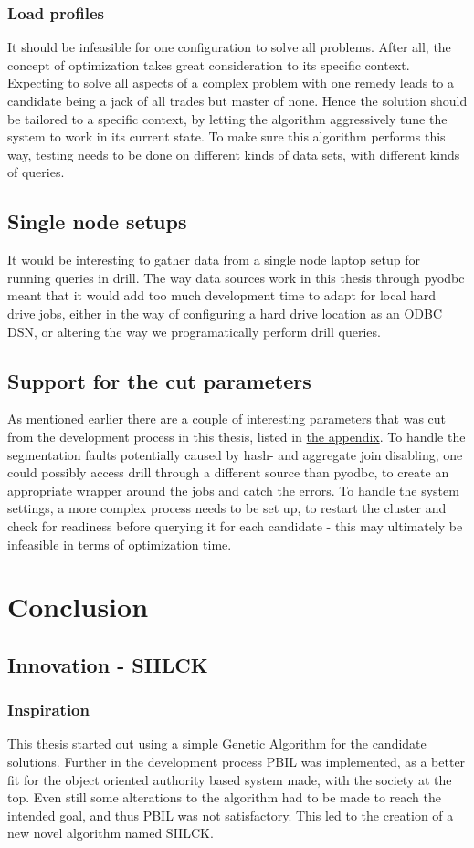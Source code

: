 \documentclass[a4paper,english]{report}
\begin{document}
	\subsection{Load profiles}
	It should be infeasible for one configuration to solve all problems. After all, the concept of optimization takes great consideration to its specific context. Expecting to solve all aspects of a complex problem with one remedy leads to a candidate being a jack of all trades but master of none. Hence the solution should be tailored to a specific context, by letting the algorithm aggressively tune the system to work in its current state. To make sure this algorithm performs this way, testing needs to be done on different kinds of data sets, with different kinds of queries.
	\section{Single node setups}
	It would be interesting to gather data from a single node laptop setup for running queries in drill. The way data sources work in this thesis through pyodbc meant that it would add too much development time to adapt for local hard drive jobs, either in the way of configuring a hard drive location as an ODBC DSN, or altering the way we programatically perform drill queries. 
	\section{Support for the cut parameters}
	As mentioned earlier there are a couple of interesting parameters that was cut from the development process in this thesis, listed in \hyperref[table:removed_params]{the appendix}. To handle the segmentation faults potentially caused by hash- and aggregate join disabling, one could possibly access drill through a different source than pyodbc, to create an appropriate wrapper around the jobs and catch the errors. To handle the system settings, a more complex process needs to be set up, to restart the cluster and check for readiness before querying it for each candidate - this may ultimately be infeasible in terms of optimization time.
	
	\chapter{Conclusion}
	\section{Innovation - SIILCK}
		\subsection{Inspiration}
		This thesis started out using a simple Genetic Algorithm for the candidate solutions. Further in the development process PBIL was implemented, as a better fit for the object oriented authority based system made, with the society at the top. Even still some alterations to the algorithm had to be made to reach the intended goal, and thus PBIL was not satisfactory. This led to the creation of a new novel algorithm named SIILCK.
\end{document}
